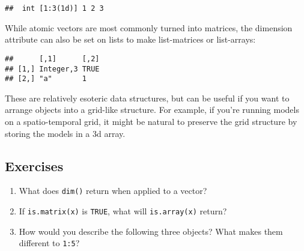 \begin{verbatim}
##  int [1:3(1d)] 1 2 3
\end{verbatim}

While atomic vectors are most commonly turned into matrices, the
dimension attribute can also be set on lists to make list-matrices or
list-arrays:  

\begin{Shaded}
\begin{Highlighting}[]
\StringTok{ }\NormalTok{(}\OperatorTok{:}\NormalTok{, }\NormalTok{, }\NormalTok{, }\NormalTok{)}
\StringTok{ }\NormalTok{(}\NormalTok{, }\NormalTok{)}
\end{Highlighting}
\end{Shaded}

\begin{verbatim}
##      [,1]      [,2]
## [1,] Integer,3 TRUE
## [2,] "a"       1
\end{verbatim}

These are relatively esoteric data structures, but can be useful if you
want to arrange objects into a grid-like structure. For example, if
you're running models on a spatio-temporal grid, it might be natural to
preserve the grid structure by storing the models in a 3d array.

\hypertarget{exercises-2}{%
\subsection{Exercises}\label{exercises-2}}

\begin{enumerate}
\def\labelenumi{\arabic{enumi}.}
\item
  What does \texttt{dim()} return when applied to a vector?
\item
  If \texttt{is.matrix(x)} is \texttt{TRUE}, what will
  \texttt{is.array(x)} return?
\item
  How would you describe the following three objects? What makes them
  different to \texttt{1:5}?

\begin{Shaded}
\begin{Highlighting}[]
\StringTok{ }\NormalTok{(}\OperatorTok{:}\NormalTok{, }\NormalTok{(}\NormalTok{, }\NormalTok{, }\NormalTok{))}
\StringTok{ }\NormalTok{(}\OperatorTok{:}\NormalTok{, }\NormalTok{(}\NormalTok{, }\NormalTok{, }\NormalTok{))}
\StringTok{ }\NormalTok{(}\OperatorTok{:}\NormalTok{, }\NormalTok{(}\NormalTok{, }\NormalTok{, }\NormalTok{))}
\end{Highlighting}
\end{Shaded}
\end{enumerate}


